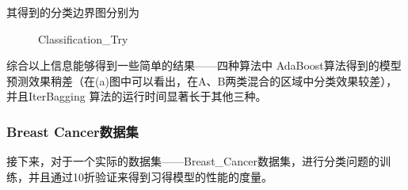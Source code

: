 \documentclass[UTF8]{ctexart}
\begin{document}
其得到的分类边界图分别为
\begin{figure}[htbp]
	\centering
	\quad
	\quad
	\quad
	\caption{Classification\_Try}
\end{figure}
综合以上信息能够得到一些简单的结果——四种算法中 AdaBoost算法得到的模型预测效果稍差（在(a)图中可以看出，在A、B两类混合的区域中分类效果较差），并且IterBagging 算法的运行时间显著长于其他三种。

\subsubsection{Breast Cancer数据集}
接下来，对于一个实际的数据集——Breast\_Cancer数据集，进行分类问题的训练，并且通过10折验证来得到习得模型的性能的度量。
\end{document}
